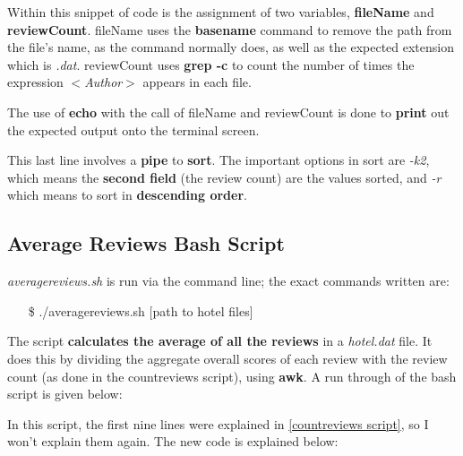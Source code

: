 \documentclass{article}
\begin{document}
	
	
	
	Within this snippet of code is the assignment of two variables, \textbf{fileName} and \textbf{reviewCount}.
	\newline
	fileName uses the \textbf{basename} command to remove the path from the file's name, as the command normally does, as well as the expected extension which is \textit{.dat}.\newline
	reviewCount uses \textbf{grep -c} to count the number of times the expression \textit{$<$Author$>$} appears in each file. 
	
	
	
	
	The use of \textbf{echo} with the call of fileName and reviewCount is done to \textbf{print} out the expected output onto the terminal screen. 
	
	
	
	
	This last line involves a \textbf{pipe} to \textbf{sort}. The important options in sort are \textit{-k2}, which means the \textbf{second field} (the review count) are the values sorted, and \textit{-r} which means to sort in \textbf{descending order}.
	
	\newpage
	
	\subsection{Average Reviews Bash Script} \label{averagereviews script}
	
	\textit{averagereviews.sh} is run via the command line; the exact commands written are: 
	
	\begin{itemize}
		\item [\$] ./averagereviews.sh [path to hotel files]
	\end{itemize}
	
	The script \textbf{calculates the average of all the reviews} in a \textit{hotel.dat} file. It does this by dividing the aggregate overall scores of each review with the review count (as done in the countreviews script), using \textbf{awk}. A run through of the bash script is given below: 
	
	
	
	
	In this script, the first nine lines were explained in \ref{countreviews script}, so I won't explain them again. The new code is explained below: 
	
\end{document}
